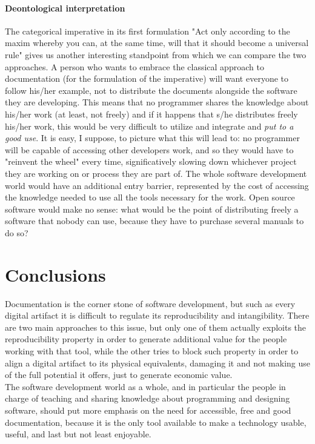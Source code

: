 \documentclass{article}
\begin{document}
			\paragraph{Deontological interpretation}
				The categorical imperative in its first formulation "Act only according to the maxim whereby you can, at the same time, will that it should become a universal rule"\cite{categoricalimperative} gives us another interesting standpoint from which we can compare the two approaches. A person who wants to embrace the classical approach to documentation (for the formulation of the imperative) will want everyone to follow his/her example, not to distribute the documents alongside the software they are developing. This means that no programmer shares the knowledge about his/her work (at least, not freely) and if it happens that s/he distributes freely his/her work, this would be very difficult to utilize and integrate and \textit{put to a good use}. It is easy, I suppose, to picture what this will lead to: no programmer will be capable of accessing other developers work, and so they would have to "reinvent the wheel" every time, significatively slowing down whichever project they are working on or process they are part of. The whole software development world would have an additional entry barrier, represented by the cost of accessing the knowledge needed to use all the tools necessary for the work. Open source software would make no sense: what would be the point of distributing freely a software that nobody can use, because they have to purchase several manuals to do so?
	
	\section{Conclusions}
		Documentation is the corner stone of software development, but such as every digital artifact it is difficult to regulate its reproducibility and intangibility. There are two main approaches to this issue, but only one of them actually exploits the reproducibility property in order to generate additional value for the people working with that tool, while the other tries to block such property in order to align a digital artifact to its physical equivalents, damaging it and not making use of the full potential it offers, just to generate economic value.\\
		The software development world as a whole, and in particular the people in charge of teaching and sharing knowledge about programming and designing software, should put more emphasis on the need for accessible, free and good documentation, because it is the only tool available to make a technology usable, useful, and last but not least enjoyable.
	
	\clearpage
	\printbibliography
\end{document}
